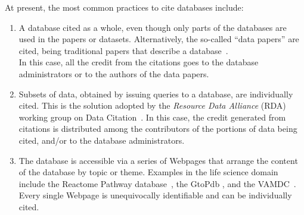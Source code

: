 \documentclass[preprint,12pt,sort&compress]{elsarticle}
\newcommand{\eat}[1]{}
\newcommand{\scream}[1]{{\bf * #1 *}{\typeout{#1}}}
\begin{document}
At present, the most common practices to cite databases include:
\begin{enumerate}
    \item A database cited as a whole, even though only parts of the databases are used in the papers or datasets. Alternatively, the so-called ``data papers'' are cited, being traditional papers that describe a database~\citep{CandelaEtAl2015}. \\
    In this case, all the credit from the citations goes to the database administrators or to the authors of the data papers. 
    \item Subsets of data, obtained by issuing queries to a database, are individually cited. This is the solution adopted by the \emph{Resource Data Alliance} (RDA) working group on Data Citation~\citep{RauberEtAl2016}.
    In this case, the credit generated from citations is distributed among the contributors of the portions of data being cited, and/or to the database administrators. 
    \item The database is accessible via a series of Webpages that arrange the content of the database by topic or theme. Examples in the life science domain include the Reactome Pathway database~\citep{reactome2016}, the GtoPdb \citep{iuphar2018}, and the VAMDC~\citep{ZwolfEtAl2016}.
     Every single Webpage is unequivocally identifiable and can be individually cited. 
\end{enumerate}

\eat{
\textcolor{red}{Despite all the research efforts dedicated to the study and promotion of data citation, none of the largest citation-based systems, such as Elsevier Scopus, Web of Science, Microsoft Academia, or Google Scholar, consider scientific datasets as citable objects in academic work. 
Clarivate Analytics Data Citation Index (DCI) \citep{force2016research} is an exception, since its infrastructure tracks data usage in scientific domains and provides the technical means to connect datasets and repositories to scientific papers. However, DCI considers only citations to (previously registered and approved) databases as a whole and does not count citations to database portions such as views, tables, or tuples.}
\scream{GMS: I'd remove (eat env.) this part about citation-based indexes because we are not proposing any solution for that problem.}
}
\end{document}
